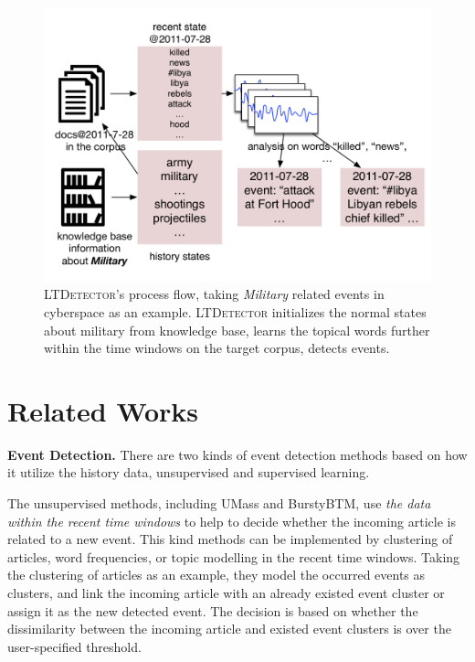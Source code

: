 \documentclass{article}
\begin{document}
\begin{figure}[h]
    \centering
    \includegraphics[width=.82\columnwidth]{img/NSDetectorExample.pdf}
    \caption{\textsc{LTDetector}'s process flow, taking \textit{Military} related events in cyberspace as an example. \textsc{LTDetector} initializes the normal states about military from knowledge base, learns the topical words further within the time windows on the target corpus, detects events.}
    \label{fig:modelDesc}
\end{figure}




\section{Related Works}
\label{sec:relatedWorks}
\textbf{Event Detection.} 
There are two kinds of event detection methods based on how it utilize the history data, unsupervised and supervised learning.

The unsupervised methods, including UMass\cite{Allan:2000wu} and BurstyBTM\cite{Yan:2015wm}, use \textit{the data within the recent time windows} to help to decide whether the incoming article is related to a new event. 
This kind methods can be implemented by clustering of articles\cite{Allan:2000wu,Petrovic:2010uj,Wurzer:2015wq}, word frequencies\cite{Mathioudakis:2010fc}\cite{Weng:2011wz}, or topic modelling\cite{Diao:2012wj}\cite{Yan:2015wm} in the recent time windows. 
Taking the clustering of articles as an example, they model the occurred events as clusters, and link the incoming article with an already existed event cluster or assign it as the new detected event.
The decision is based on whether the dissimilarity between the incoming article and existed event clusters is over the user-specified threshold. 
\end{document}
